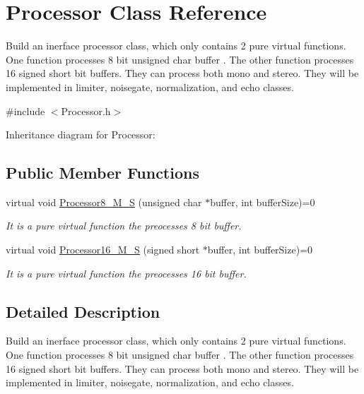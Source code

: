 \hypertarget{classProcessor}{}\section{Processor Class Reference}
\label{classProcessor}


Build an inerface processor class, which only contains 2 pure virtual functions. One function processes 8 bit unsigned char buffer . The other function processes 16 signed short bit buffers. They can process both mono and stereo. They will be implemented in limiter, noisegate, normalization, and echo classes.  




{\ttfamily \#include $<$Processor.\+h$>$}



Inheritance diagram for Processor\+:
\subsection*{Public Member Functions}
\begin{DoxyCompactItemize}
\item 
virtual void \hyperlink{classProcessor_a5a977cc3596fdeac860d5e28a99806a1}{Processor8\+\_\+\+M\+\_\+S} (unsigned char $\ast$buffer, int buffer\+Size)=0
\begin{DoxyCompactList}\small\item\em It is a pure virtual function the preocesses 8 bit buffer. \end{DoxyCompactList}\item 
virtual void \hyperlink{classProcessor_a2a0903d1ca9e627e8a45e5159ecc0505}{Processor16\+\_\+\+M\+\_\+S} (signed short $\ast$buffer, int buffer\+Size)=0
\begin{DoxyCompactList}\small\item\em It is a pure virtual function the preocesses 16 bit buffer. \end{DoxyCompactList}\end{DoxyCompactItemize}


\subsection{Detailed Description}
Build an inerface processor class, which only contains 2 pure virtual functions. One function processes 8 bit unsigned char buffer . The other function processes 16 signed short bit buffers. They can process both mono and stereo. They will be implemented in limiter, noisegate, normalization, and echo classes. 

